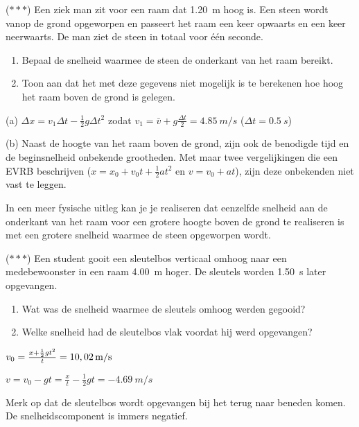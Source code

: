 \documentclass{ximera}
\begin{document}
\begin{exercise}
    ($\ast\ast\ast$) Een ziek man zit voor een raam dat \SI{1,20}{m} hoog is. Een steen wordt vanop de grond opgeworpen en passeert het raam een keer opwaarts en een keer neerwaarts. De man ziet de steen in totaal voor \'e\'en seconde.%
    \begin{enumerate}
        \item Bepaal de snelheid waarmee de steen de onderkant van het raam bereikt.%
        \item Toon aan dat het met deze gegevens niet mogelijk is te berekenen hoe hoog het raam boven de grond is gelegen.
    \end{enumerate}
    \begin{oplossing}
        (a) $\Delta x= v_1\Delta t-\frac{1}{2}g\Delta t^2$ zodat $v_1=\bar{v}+g\frac{\Delta t}{2}=\SI{4,85}{m/s}$ ($\Delta t = \SI{0,5}{s}$)
        
        (b) Naast de hoogte van het raam boven de grond, zijn ook de benodigde tijd en de beginsnelheid onbekende grootheden. Met maar twee vergelijkingen die een EVRB beschrijven ($x=x_0+v_0t+\frac{1}{2}at^2$ en $v=v_0+at$), zijn deze onbekenden niet vast te leggen. 
        
        In een meer fysische uitleg kan je je realiseren dat eenzelfde snelheid aan de onderkant van het raam voor een grotere hoogte boven de grond te realiseren is met een grotere snelheid waarmee de steen opgeworpen wordt.
    \end{oplossing}
\end{exercise}

\begin{exercise}
    ($\ast\ast\ast$) Een student gooit een sleutelbos verticaal omhoog naar een medebewoonster in een raam \SI{4,00}{m} hoger. De sleutels worden \SI{1,50}{s} later opgevangen.
    \begin{enumerate}
        \item Wat was de snelheid waarmee de sleutels omhoog werden gegooid?
        \item Welke snelheid had de sleutelbos vlak voordat hij werd opgevangen?
    \end{enumerate}
    \begin{oplossing}
        $v_0=\frac{x+\frac{1}{2}gt^2}{t}=10,02\rm\,m/s$ 

        $v=v_0-gt=\frac{x}{t}-\frac{1}{2}gt=\SI{-4,69}{m/s}$

        Merk op dat de sleutelbos wordt opgevangen bij het terug naar beneden komen. De snelheidscomponent is immers negatief.
    \end{oplossing}
\end{exercise}
\end{document}
